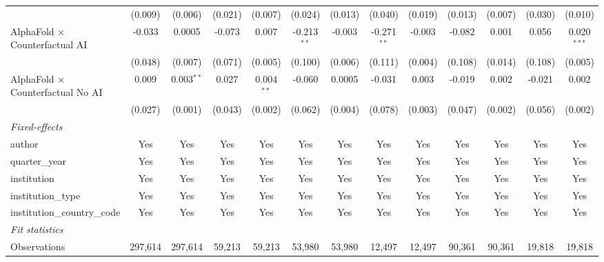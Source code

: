 \begin{tabular}{lcccccccccccc}
                                            & (0.009)     & (0.006)       & (0.021) & (0.007)      & (0.024)       & (0.013) & (0.040)       & (0.019) & (0.013)       & (0.007) & (0.030)     & (0.010)\\   
   AlphaFold $\times$ Counterfactual AI     & -0.033      & 0.0005        & -0.073  & 0.007        & -0.213$^{**}$ & -0.003  & -0.271$^{**}$ & -0.003  & -0.082        & 0.001   & 0.056       & 0.020$^{***}$\\   
                                            & (0.048)     & (0.007)       & (0.071) & (0.005)      & (0.100)       & (0.006) & (0.111)       & (0.004) & (0.108)       & (0.014) & (0.108)     & (0.005)\\   
   AlphaFold $\times$ Counterfactual No AI  & 0.009       & 0.003$^{**}$  & 0.027   & 0.004$^{**}$ & -0.060        & 0.0005  & -0.031        & 0.003   & -0.019        & 0.002   & -0.021      & 0.002\\   
                                            & (0.027)     & (0.001)       & (0.043) & (0.002)      & (0.062)       & (0.004) & (0.078)       & (0.003) & (0.047)       & (0.002) & (0.056)     & (0.002)\\   
   \midrule
   \emph{Fixed-effects}\\
   author                                   & Yes         & Yes           & Yes     & Yes          & Yes           & Yes     & Yes           & Yes     & Yes           & Yes     & Yes         & Yes\\  
   quarter\_year                            & Yes         & Yes           & Yes     & Yes          & Yes           & Yes     & Yes           & Yes     & Yes           & Yes     & Yes         & Yes\\  
   institution                              & Yes         & Yes           & Yes     & Yes          & Yes           & Yes     & Yes           & Yes     & Yes           & Yes     & Yes         & Yes\\  
   institution\_type                        & Yes         & Yes           & Yes     & Yes          & Yes           & Yes     & Yes           & Yes     & Yes           & Yes     & Yes         & Yes\\  
   institution\_country\_code               & Yes         & Yes           & Yes     & Yes          & Yes           & Yes     & Yes           & Yes     & Yes           & Yes     & Yes         & Yes\\  
   \midrule
   \emph{Fit statistics}\\
   Observations                             & 297,614     & 297,614       & 59,213  & 59,213       & 53,980        & 53,980  & 12,497        & 12,497  & 90,361        & 90,361  & 19,818      & 19,818\\  

\end{tabular}
